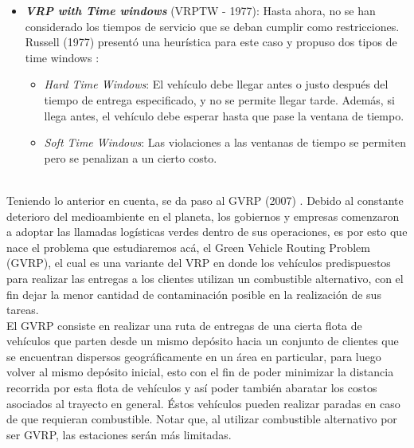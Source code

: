 \documentclass[letter, 10pt]{article}
\begin{document}
\begin{itemize}
    \item \textbf{\emph{VRP with Time windows}} (VRPTW - 1977): Hasta ahora, no se han considerado los tiempos de servicio que se deban cumplir como restricciones. Russell (1977) presentó una heurística para este caso y propuso dos tipos de time windows \cite{doi:10.1287/opre.25.3.517}:
    \begin{itemize}
        \item \emph{Hard Time Windows}: El vehículo debe llegar antes o justo después del tiempo de entrega especificado, y no se permite llegar tarde. Además, si llega antes, el vehículo debe esperar hasta que pase la ventana de tiempo.
        \item \emph{Soft Time Windows}: Las violaciones a las ventanas de tiempo se permiten pero se penalizan a un cierto costo.
    \end{itemize}
\end{itemize}
\\

Teniendo lo anterior en cuenta, se da paso al GVRP (2007) \cite{LIN20141118}. Debido al constante deterioro del medioambiente en el planeta, los gobiernos y empresas comenzaron a adoptar las llamadas logísticas verdes dentro de sus operaciones, es por esto que nace el problema que estudiaremos acá, el Green Vehicle Routing Problem (GVRP), el cual es una variante del VRP en donde los vehículos predispuestos para realizar las entregas a los clientes utilizan un combustible alternativo, con el fin dejar la menor cantidad de contaminación posible en la realización de sus tareas.
\\

El GVRP consiste en realizar una ruta de entregas de una cierta flota de vehículos que parten desde un mismo depósito hacia un conjunto de clientes que se encuentran dispersos geográficamente en un área en particular, para luego volver al mismo depósito inicial, esto con el fin de poder minimizar la distancia recorrida por esta flota de vehículos y así poder también abaratar los costos asociados al trayecto en general. Éstos vehículos pueden realizar paradas en caso de que requieran combustible. Notar que, al utilizar combustible alternativo por ser GVRP, las estaciones serán más limitadas.
\\
\end{document}
